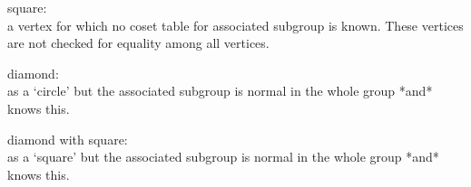 square:\\
    a vertex for which  no coset table for  associated subgroup is known.
    These vertices are not checked for equality among all vertices.

diamond:\\
    as  a `circle' but   the associated subgroup  is  normal in the whole
    group *and* {\GAP} knows this.

diamond with square:\\
    as a  `square'  but the associated subgroup  is  normal in  the whole
    group *and* {\GAP} knows this.


